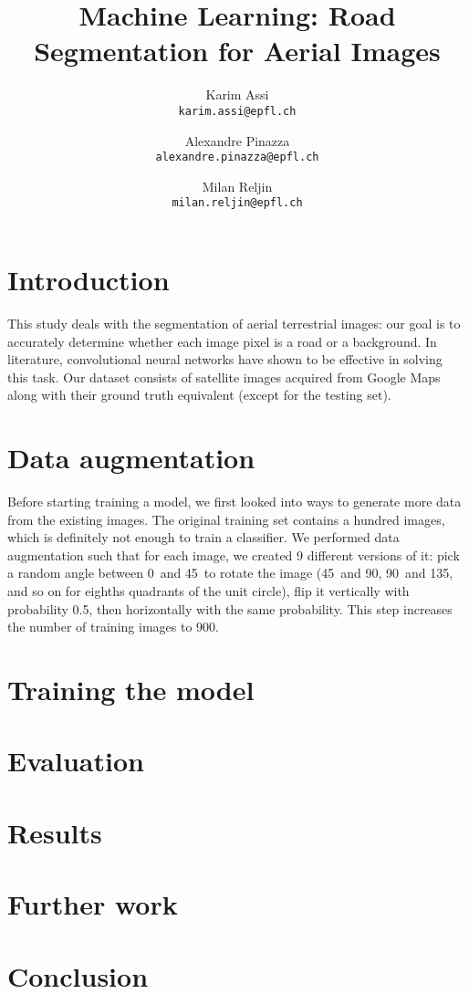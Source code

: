 \documentclass[10pt,conference,compsocconf]{IEEEtran}
\begin{document}
\title{Machine Learning: Road Segmentation for Aerial Images}
\author{
  Karim Assi\\
  \texttt{karim.assi@epfl.ch}
  \and
  Alexandre Pinazza\\
  \texttt{alexandre.pinazza@epfl.ch}
  \and
  Milan Reljin\\
  \texttt{milan.reljin@epfl.ch}
}

\maketitle

    

\section{Introduction}

This study deals with the segmentation of aerial terrestrial images: our goal is to accurately determine whether each image pixel is a road or a background. In literature, convolutional neural networks have shown to be effective in solving this task. %
Our dataset consists of satellite images acquired from Google Maps along with their ground truth equivalent (except for the testing set).

\section{Data augmentation}

Before starting training a model, we first looked into ways to generate more data from the existing images. The original training set contains a hundred images, which is definitely not enough to train a classifier. We performed data augmentation such that for each image, we created 9 different versions of it: pick a random angle between 0\textdegree\ and 45\textdegree\ to rotate the image (45\textdegree\ and 90\textdegree, 90\textdegree\  and 135\textdegree, and so on for eighths quadrants of the unit circle), flip it vertically with probability 0.5, then horizontally with the same probability. This step increases the number of training images to 900. 

\section{Training the model}

\section{Evaluation}

\section{Results}

\section{Further work}

\section{Conclusion}

% 
% 
\end{document}

